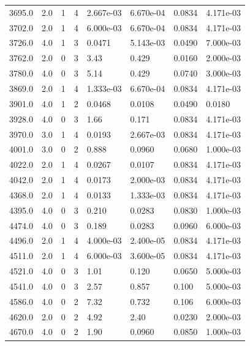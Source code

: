 \documentclass[preview]{standalone}
\begin{document}
{{{\begin{tabular}{L{1.2cm}C{1.2cm} C{0.3cm}C{0.5cm} C{1.4cm}C{1.4cm} C{1.4cm}C{1.4cm}}
  3695.0  &   2.0  & 1     &  4 &  2.667e-03  & 6.670e-04  & 0.0834 &  4.171e-03   \\ 
  3702.0  &   2.0  & 1     &  4 &  6.000e-03  & 6.670e-04  & 0.0834 &  4.171e-03   \\ 
  3726.0  &   4.0  & 1     &  3 &  0.0471  & 5.143e-03  & 0.0490 &  7.000e-03   \\ 
  3762.0  &   2.0  & 0     &  3 &  3.43  & 0.429  & 0.0160 &  2.000e-03   \\ 
  3780.0  &   4.0  & 0     &  3 &  5.14  & 0.429  & 0.0740 &  3.000e-03   \\ 
  3869.0  &   2.0  & 1     &  4 &  1.333e-03  & 6.670e-04  & 0.0834 &  4.171e-03   \\ 
  3901.0  &   4.0  & 1     &  2 &  0.0468  & 0.0108  & 0.0490 &  0.0180   \\ 
  3928.0  &   4.0  & 0     &  3 &  1.66  & 0.171  & 0.0834 &  4.171e-03   \\ 
  3970.0  &   3.0  & 1     &  4 &  0.0193  & 2.667e-03  & 0.0834 &  4.171e-03   \\ 
  4001.0  &   3.0  & 0     &  2 &  0.888  & 0.0960  & 0.0680 &  1.000e-03   \\ 
  4022.0  &   2.0  & 1     &  4 &  0.0267  & 0.0107  & 0.0834 &  4.171e-03   \\ 
  4042.0  &   2.0  & 1     &  4 &  0.0173  & 2.000e-03  & 0.0834 &  4.171e-03   \\ 
  4368.0  &   2.0  & 1     &  4 &  0.0133  & 1.333e-03  & 0.0834 &  4.171e-03   \\ 
  4395.0  &   4.0  & 0     &  3 &  0.210  & 0.0283  & 0.0830 &  1.000e-03   \\ 
  4474.0  &   4.0  & 0     &  3 &  0.189  & 0.0283  & 0.0960 &  6.000e-03   \\ 
  4496.0  &   2.0  & 1     &  4 &  4.000e-03  & 2.400e-05  & 0.0834 &  4.171e-03   \\ 
  4511.0  &   2.0  & 1     &  4 &  6.000e-03  & 3.600e-05  & 0.0834 &  4.171e-03   \\ 
  4521.0  &   4.0  & 0     &  3 &  1.01  & 0.120  & 0.0650 &  5.000e-03   \\ 
  4541.0  &   4.0  & 0     &  3 &  2.57  & 0.857  & 0.100 &  5.000e-03   \\ 
  4586.0  &   4.0  & 0     &  2 &  7.32  & 0.732  & 0.106 &  6.000e-03   \\ 
  4620.0  &   2.0  & 0     &  2 &  4.92  & 2.40  & 0.0230 &  2.000e-03   \\ 
  4670.0  &   4.0  & 0     &  2 &  1.90  & 0.0960  & 0.0850 &  1.000e-03   \\ 

\end{tabular}}}}
\end{document}
